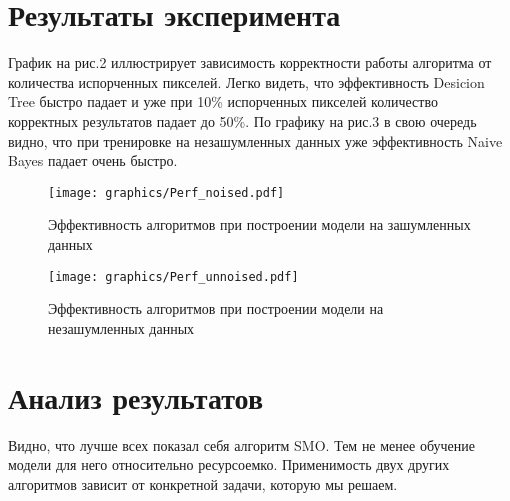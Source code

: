 \documentclass{article}
\begin{document}
\section{Результаты эксперимента}
График на рис.2 иллюстрирует зависимость корректности работы алгоритма от количества испорченных пикселей. Легко видеть, что эффективность Desicion Tree быстро падает и уже при 10\% испорченных пикселей количество корректных результатов падает до 50\%.
По графику на рис.3 в свою очередь видно, что при тренировке на незашумленных данных уже эффективность Naive Bayes падает очень быстро.
\begin{figure}[ht]
\texttt{[image: graphics/Perf\_noised.pdf]}
\captionsetup{justification=centering}
\caption{Эффективность алгоритмов при построении модели на зашумленных данных}
\end{figure}
\begin{figure}[ht!]
\texttt{[image: graphics/Perf\_unnoised.pdf]}
\captionsetup{justification=centering}
\caption{Эффективность алгоритмов при построении модели на незашумленных данных}
\end{figure}

\section{Анализ результатов}
Видно, что лучше всех показал себя алгоритм SMO. Тем не менее обучение модели для него относительно ресурсоемко. Применимость двух других алгоритмов зависит от конкретной задачи, которую мы решаем.

{}
\end{document}
